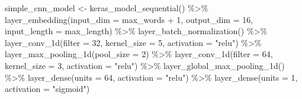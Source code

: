 \documentclass[
]{article}
\newenvironment{Shaded}{}{}
\newcommand{\AttributeTok}[1]{\textcolor[rgb]{0.49,0.56,0.16}{#1}}
\newcommand{\DecValTok}[1]{\textcolor[rgb]{0.25,0.63,0.44}{#1}}
\newcommand{\FunctionTok}[1]{\textcolor[rgb]{0.02,0.16,0.49}{#1}}
\newcommand{\NormalTok}[1]{#1}
\newcommand{\OtherTok}[1]{\textcolor[rgb]{0.00,0.44,0.13}{#1}}
\newcommand{\SpecialCharTok}[1]{\textcolor[rgb]{0.25,0.44,0.63}{#1}}
\newcommand{\StringTok}[1]{\textcolor[rgb]{0.25,0.44,0.63}{#1}}
\begin{document}
\begin{Shaded}
\begin{Highlighting}[]
\NormalTok{simple\_cnn\_model }\OtherTok{\textless{}{-}} \FunctionTok{keras\_model\_sequential}\NormalTok{() }\SpecialCharTok{\%\textgreater{}\%}
    \FunctionTok{layer\_embedding}\NormalTok{(}\AttributeTok{input\_dim =}\NormalTok{ max\_words }\SpecialCharTok{+} \DecValTok{1}\NormalTok{, }\AttributeTok{output\_dim =} \DecValTok{16}\NormalTok{, }\AttributeTok{input\_length =}\NormalTok{ max\_length) }\SpecialCharTok{\%\textgreater{}\%}
    \FunctionTok{layer\_batch\_normalization}\NormalTok{() }\SpecialCharTok{\%\textgreater{}\%}
    \FunctionTok{layer\_conv\_1d}\NormalTok{(}\AttributeTok{filter =} \DecValTok{32}\NormalTok{, }\AttributeTok{kernel\_size =} \DecValTok{5}\NormalTok{, }\AttributeTok{activation =} \StringTok{"relu"}\NormalTok{) }\SpecialCharTok{\%\textgreater{}\%}
    \FunctionTok{layer\_max\_pooling\_1d}\NormalTok{(}\AttributeTok{pool\_size =} \DecValTok{2}\NormalTok{) }\SpecialCharTok{\%\textgreater{}\%}
    \FunctionTok{layer\_conv\_1d}\NormalTok{(}\AttributeTok{filter =} \DecValTok{64}\NormalTok{, }\AttributeTok{kernel\_size =} \DecValTok{3}\NormalTok{, }\AttributeTok{activation =} \StringTok{"relu"}\NormalTok{) }\SpecialCharTok{\%\textgreater{}\%}
    \FunctionTok{layer\_global\_max\_pooling\_1d}\NormalTok{() }\SpecialCharTok{\%\textgreater{}\%}
    \FunctionTok{layer\_dense}\NormalTok{(}\AttributeTok{units =} \DecValTok{64}\NormalTok{, }\AttributeTok{activation =} \StringTok{"relu"}\NormalTok{) }\SpecialCharTok{\%\textgreater{}\%}
    \FunctionTok{layer\_dense}\NormalTok{(}\AttributeTok{units =} \DecValTok{1}\NormalTok{, }\AttributeTok{activation =} \StringTok{"sigmoid"}\NormalTok{)}


\end{Highlighting}
\end{Shaded}
\end{document}
